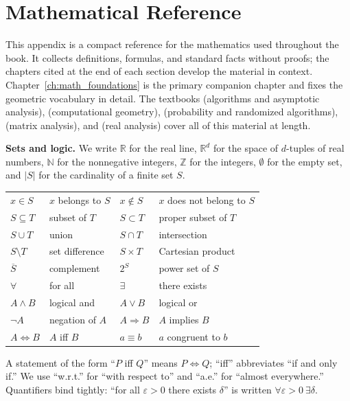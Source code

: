 \chapter{Mathematical Reference}
\label{app:math_reference}

This appendix is a compact reference for the mathematics used throughout the
book. It collects definitions, formulas, and standard facts without proofs;
the chapters cited at the end of each section develop the material in
context. Chapter~\ref{ch:math_foundations} is the primary companion chapter
and fixes the geometric vocabulary in detail. The textbooks
\cite{cormen2009} (algorithms and asymptotic analysis), \cite{deberg2008}
(computational geometry), \cite{mitzenmacher2005} (probability and randomized
algorithms), \cite{horn1985} (matrix analysis), and \cite{rudin1976} (real
analysis) cover all of this material at length.

\medskip
\noindent\textbf{Sets and logic.}
We write $\mathbb{R}$ for the real line, $\mathbb{R}^d$ for the space of
$d$-tuples of real numbers, $\mathbb{N}$ for the nonnegative integers,
$\mathbb{Z}$ for the integers, $\emptyset$ for the empty set, and $|S|$ for
the cardinality of a finite set $S$.

\begin{center}
\begin{tabular}{llll}
\toprule
$x \in S$ & $x$ belongs to $S$ &
$x \notin S$ & $x$ does not belong to $S$ \\
$S \subseteq T$ & subset of $T$ &
$S \subset T$ & proper subset of $T$ \\
$S \cup T$ & union &
$S \cap T$ & intersection \\
$S \setminus T$ & set difference &
$S \times T$ & Cartesian product \\
$\overline{S}$ & complement &
$2^S$ & power set of $S$ \\
$\forall$ & for all &
$\exists$ & there exists \\
$A \wedge B$ & logical and &
$A \vee B$ & logical or \\
$\neg A$ & negation of $A$ &
$A \Rightarrow B$ & $A$ implies $B$ \\
$A \iff B$ & $A$ iff $B$ &
$a \equiv b$ & $a$ congruent to $b$ \\
\bottomrule
\end{tabular}
\end{center}

A statement of the form ``$P$ iff $Q$'' means $P \iff Q$; ``iff'' abbreviates
``if and only if.'' We use ``w.r.t.'' for ``with respect to'' and
``a.e.'' for ``almost everywhere.'' Quantifiers bind tightly: ``for all
$\varepsilon > 0$ there exists $\delta$'' is written
$\forall\varepsilon>0\ \exists\delta$.


